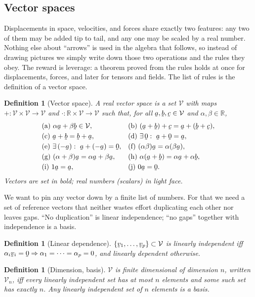 \documentclass[17pt,a4paper]{extreport}
\DeclareRobustCommand{\vek}[1]{\underaccent{\tilde}{#1}}
\newcommand{\Rn}{\mathbb{R}}
\newcommand{\V}{\mathcal{V}}
\newcommand{\Vn}{\mathcal{V}_{n}}
\newcommand{\ba}{\vek{a}}
\newcommand{\bb}{\vek{b}}
\newcommand{\bc}{\vek{c}}
\newcommand{\bv}{\vek{v}}
\newcommand{\bze}{\vek{0}}
\theoremstyle{scplain}
\theoremstyle{scdefn}
\newtheorem{definition}[theorem]{Definition}
\theoremstyle{scplain}
\begin{document}
\subsection{Vector spaces}\label{ss:vs}

Displacements in space, velocities, and forces share exactly two features:
any two of them may be added tip to tail, and any one may be scaled by a
real number. Nothing else about ``arrows'' is used in the algebra that
follows, so instead of drawing pictures we simply write down those two
operations and the rules they obey. The reward is leverage: a theorem
proved from the rules holds at once for displacements, forces, and later
for tensors and fields. The list of rules is the definition of a vector
space.

\begin{definition}[Vector space]\label{def:vs}
A real vector space is a set $\V$ with maps $+:\V\times\V\to\V$ and
$\cdot:\Rn\times\V\to\V$ such that, for all $\ba,\bb,\bc\in\V$ and
$\alpha,\beta\in\Rn$,
\[
\begin{array}{ll}
\text{(a)}\ \alpha\ba+\beta\bb\in\V, &
\text{(b)}\ (\ba+\bb)+\bc=\ba+(\bb+\bc), \\[1mm]
\text{(c)}\ \ba+\bb=\bb+\ba, &
\text{(d)}\ \exists\,\bze:\ \ba+\bze=\ba, \\[1mm]
\text{(e)}\ \exists\,(-\ba):\ \ba+(-\ba)=\bze, &
\text{(f)}\ (\alpha\beta)\ba=\alpha(\beta\ba), \\[1mm]
\text{(g)}\ (\alpha+\beta)\ba=\alpha\ba+\beta\ba, &
\text{(h)}\ \alpha(\ba+\bb)=\alpha\ba+\alpha\bb, \\[1mm]
\text{(i)}\ 1\ba=\ba, & \text{(j)}\ 0\ba=\bze.
\end{array}
\]
Vectors are set in bold; real numbers (scalars) in light face.
\end{definition}

We want to pin any vector down by a finite list of numbers. For that we
need a set of reference vectors that neither wastes effort duplicating each
other nor leaves gaps. ``No duplication'' is linear independence; ``no
gaps'' together with independence is a basis.

\begin{definition}[Linear dependence]\label{def:lindep}
$\{\bv_{1},\dots,\bv_{p}\}\subset\V$ is linearly independent iff
$\alpha_{i}\bv_{i}=\bze\Rightarrow\alpha_{1}=\cdots=\alpha_{p}=0$, and
linearly dependent otherwise.
\end{definition}

\begin{definition}[Dimension, basis]\label{def:dim}
$\V$ is finite dimensional of dimension $n$, written $\Vn$, iff every
linearly independent set has at most $n$ elements and some such set has
exactly $n$. Any linearly independent set of $n$ elements is a basis.
\end{definition}
\end{document}
